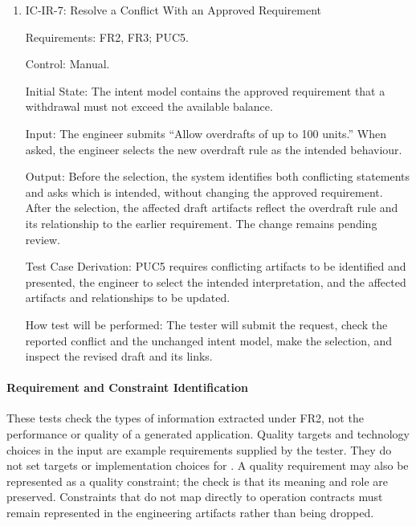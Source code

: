 \documentclass[12pt, titlepage]{article}
\begin{document}
\begin{enumerate}
How test will be performed: The tester will follow the withdrawal refinement
flow, state the scope exclusions, and inspect the resulting requirements and
contracts for unwanted features. Recording exclusions or declined suggestions
as context is acceptable.

\item{IC-IR-7: Resolve a Conflict With an Approved Requirement\\}

Requirements: FR2, FR3; PUC5.

Control: Manual.

Initial State: The intent model contains the approved requirement that a
withdrawal must not exceed the available balance.

Input: The engineer submits ``Allow overdrafts of up to 100 units.'' When asked,
the engineer selects the new overdraft rule as the intended behaviour.

Output: Before the selection, the system identifies both conflicting statements
and asks which is intended, without changing the approved requirement. After
the selection, the affected draft artifacts reflect the overdraft rule and its
relationship to the earlier requirement. The change remains pending review.

Test Case Derivation: PUC5 requires conflicting artifacts to be identified and
presented, the engineer to select the intended interpretation, and the affected
artifacts and relationships to be updated.

How test will be performed: The tester will submit the request, check the
reported conflict and the unchanged intent model, make the selection, and
inspect the revised draft and its links.

\end{enumerate}

\paragraph{Requirement and Constraint Identification}

These tests check the types of information extracted under FR2, not the
performance or quality of a generated application. Quality targets and
technology choices in the input are example requirements supplied by the
tester. They do not set targets or implementation choices for \progname{}.
A quality requirement may also be represented as a quality constraint;
the check is that its meaning and role are preserved. Constraints that do
not map directly to operation contracts must remain represented in the
engineering artifacts rather than being dropped.
\end{document}
